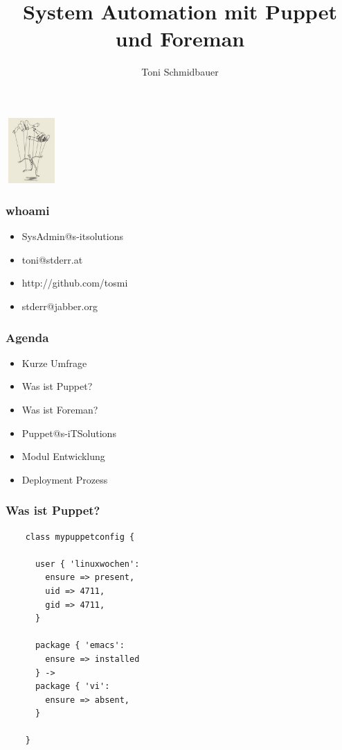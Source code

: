 \documentclass{beamer}
\title{System Automation mit Puppet und Foreman\\}
\author{Toni Schmidbauer}
\begin{document}
\begin{frame}
\center\includegraphics[height=2.5cm,width=2cm]{../pics/puppet.png}
\titlepage

\end{frame}

\begin{frame}
  \frametitle{whoami}
  \begin{itemize}
  \item SysAdmin@s-itsolutions
  \item toni@stderr.at
  \item http://github.com/tosmi
  \item stderr@jabber.org
  \end{itemize}
\end{frame}
\begin{frame}

  \frametitle{Agenda}

  \begin{itemize}
  \item Kurze Umfrage
  \item Was ist Puppet?
  \item Was ist Foreman?
  \item Puppet@s-iTSolutions
  \item Modul Entwicklung
  \item Deployment Prozess
  \end{itemize}

\end{frame}

\begin{frame}
\end{frame}

\begin{frame}[fragile]
  \frametitle{Was ist Puppet?}

  \begin{lstlisting}
    class mypuppetconfig {

      user { 'linuxwochen':
        ensure => present,
        uid => 4711,
        gid => 4711,
      }

      package { 'emacs':
        ensure => installed
      } ->
      package { 'vi':
        ensure => absent,
      }

    }
  \end{lstlisting}
\end{frame}
\end{document}
